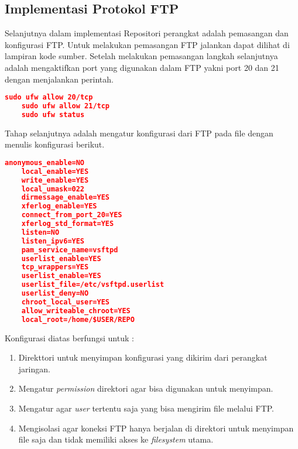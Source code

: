     \subsection{Implementasi Protokol FTP}
        Selanjutnya dalam implementasi Repositori perangkat adalah pemasangan dan konfigurasi FTP. Untuk melakukan pemasangan FTP jalankan dapat dilihat di lampiran kode sumber.
        Setelah melakukan pemasangan langkah selanjutnya adalah mengaktifkan port yang digunakan dalam FTP yakni port 20 dan 21 dengan menjalankan perintah.
    \begin{lstlisting}[frame=single,tabsize=2,breaklines,caption={Aktivasi port FTP},label=nonrootuser, captionpos=b, language=json,numbers=none]
    sudo ufw allow 20/tcp
    sudo ufw allow 21/tcp
    sudo ufw status
    \end{lstlisting}
        Tahap selanjutnya adalah mengatur konfigurasi dari FTP pada file  dengan menulis konfigurasi berikut.
    \begin{lstlisting}[frame=single,tabsize=2,breaklines,caption={Konfigurasi file FTP},label=nonrootuser, captionpos=b, language=json,numbers=none]
    anonymous_enable=NO
    local_enable=YES		
    write_enable=YES		
    local_umask=022		        
    dirmessage_enable=YES	        
    xferlog_enable=YES		
    connect_from_port_20=YES        
    xferlog_std_format=YES          
    listen=NO   			
    listen_ipv6=YES		        
    pam_service_name=vsftpd         
    userlist_enable=YES  	        
    tcp_wrappers=YES
    userlist_enable=YES                   
    userlist_file=/etc/vsftpd.userlist
    userlist_deny=NO
    chroot_local_user=YES
    allow_writeable_chroot=YES
    local_root=/home/$USER/REPO
    \end{lstlisting}
    Konfigurasi diatas berfungsi untuk : 
    	\begin{enumerate}
	    	\item Direkttori  untuk menyimpan konfigurasi yang dikirim dari perangkat jaringan.
	    	\item Mengatur \textit{permission} direktori agar bisa digunakan untuk menyimpan.
	    	\item Mengatur agar \textit{user} tertentu saja yang bisa mengirim file melalui FTP.
	    	\item Mengisolasi agar koneksi FTP hanya berjalan di direktori untuk menyimpan file saja dan tidak memiliki akses ke \textit{filesystem} utama.
	    \end{enumerate}
